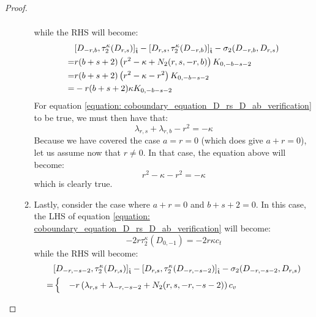 \begin{proof}
\begin{enumerate}
\begin{enumerate}
$$\begin{aligned}
                                \end{aligned}
                            $$
                        while the RHS will become:
                            $$
                                \begin{aligned}
                                    & [D_{-r, b}, \tau_2^{\kappa}(D_{r, s})]_{\extendedtoroidal} - [D_{r, s}, \tau_2^{\kappa}(D_{-r, b})]_{\extendedtoroidal} - \sigma_2(D_{-r, b}, D_{r, s})
                                    \\
                                    = & r (b + s + 2) \left( r^2 - \kappa + N_2(r, s, -r, b) \right) K_{0, -b - s - 2}
                                    \\
                                    = & r (b + s + 2) \left( r^2 - \kappa - r^2 \right) K_{0, -b - s - 2}
                                    \\
                                    = & -r (b + s + 2) \kappa K_{0, -b - s - 2}
                                \end{aligned}
                            $$
                        For equation \eqref{equation: coboundary_equation_D_rs_D_ab_verification} to be true, we must then have that:
                            $$\lambda_{r, s} + \lambda_{r, b} - r^2 = -\kappa$$
                        Because we have covered the case $a = r = 0$ (which does give $a + r = 0$), let us assume now that $r \not = 0$. In that case, the equation above will become:
                            $$r^2 - \kappa - r^2 = -\kappa$$
                        which is clearly true.
                        \item Lastly, consider the case where $a + r = 0$ and $b + s + 2 = 0$. In this case, the LHS of equation \eqref{equation: coboundary_equation_D_rs_D_ab_verification} will become:
                            $$-2r \tau_2^{\kappa}(D_{0, -1}) = -2r \kappa c_t$$
                        while the RHS will become:
                            $$
                                \begin{aligned}
                                    & [D_{-r, -s - 2}, \tau_2^{\kappa}(D_{r, s})]_{\extendedtoroidal} - [D_{r, s}, \tau_2^{\kappa}(D_{-r, -s - 2})]_{\extendedtoroidal} - \sigma_2(D_{-r, -s - 2}, D_{r, s})
                                    \\
                                    = &
                                    \begin{cases}
                                        & -r\left( \lambda_{r, s} + \lambda_{-r, -s - 2} + N_2(r, s, -r, -s - 2) \right) c_v

\end{cases}
\end{aligned}$$
\end{enumerate}
\end{enumerate}
\end{proof}
